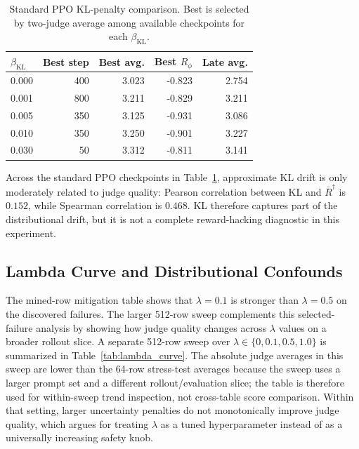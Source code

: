 \documentclass[11pt]{article}
\newcommand{\Rphi}{R_{\phi}}
\begin{document}
\begin{table}[!tbp]
\centering
\scriptsize
\caption{Standard PPO KL-penalty comparison. Best is selected by two-judge average among available checkpoints for each $\beta_{\mathrm{KL}}$.}
\label{tab:kl_beta_baseline}
\begin{tabular}{lrrrr}
\toprule
$\beta_{\mathrm{KL}}$ & Best step & Best avg. & Best $\Rphi$ & Late avg. \\
\midrule
0.000 & 400 & 3.023 & -0.823 & 2.754 \\
0.001 & 800 & 3.211 & -0.829 & 3.211 \\
0.005 & 350 & 3.125 & -0.931 & 3.086 \\
0.010 & 350 & 3.250 & -0.901 & 3.227 \\
0.030 & 50 & 3.312 & -0.811 & 3.141 \\
\bottomrule
\end{tabular}
\end{table}

Across the standard PPO checkpoints in Table~\ref{tab:kl_beta_baseline}, approximate KL drift is only moderately related to judge quality: Pearson correlation between KL and $\bar R^\dagger$ is $0.152$, while Spearman correlation is $0.468$. KL therefore captures part of the distributional drift, but it is not a complete reward-hacking diagnostic in this experiment.

\subsection{Lambda Curve and Distributional Confounds}
The mined-row mitigation table shows that $\lambda=0.1$ is stronger than $\lambda=0.5$ on the discovered failures. The larger 512-row sweep complements this selected-failure analysis by showing how judge quality changes across $\lambda$ values on a broader rollout slice. A separate 512-row sweep over $\lambda\in\{0,0.1,0.5,1.0\}$ is summarized in Table~\ref{tab:lambda_curve}. The absolute judge averages in this sweep are lower than the 64-row stress-test averages because the sweep uses a larger prompt set and a different rollout/evaluation slice; the table is therefore used for within-sweep trend inspection, not cross-table score comparison. Within that setting, larger uncertainty penalties do not monotonically improve judge quality, which argues for treating $\lambda$ as a tuned hyperparameter instead of as a universally increasing safety knob.
\end{document}
